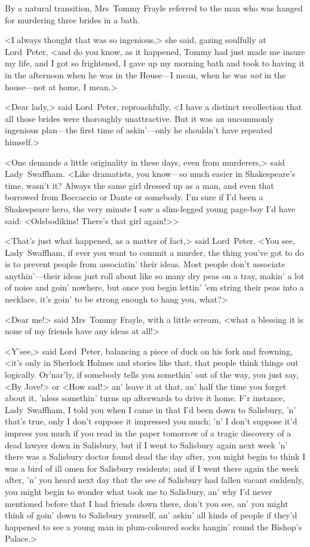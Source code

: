 By a natural transition, Mrs~Tommy Frayle referred to the man who was hanged for murdering three brides in a bath.

<I always thought that was so ingenious,> she said, gazing soulfully at Lord~Peter, <and do you know, as it happened, Tommy had just made me insure my life, and I got so frightened, I gave up my morning bath and took to having it in the afternoon when he was in the House—I mean, when he was \textit{not} in the house—not at home, I mean.>

<Dear lady,> said Lord~Peter, reproachfully, <I have a distinct recollection that all those brides were thoroughly unattractive. But it was an uncommonly ingenious plan—the first time of askin'—only he shouldn't have repeated himself.>

<One demands a little originality in these days, even from murderers,> said Lady~Swaffham. <Like dramatists, you know—so much easier in Shakespeare's time, wasn't it? Always the same girl dressed up as a man, and even that borrowed from Boccaccio or Dante or somebody. I'm sure if I'd been a Shakespeare hero, the very minute I saw a slim-legged young page-boy I'd have said: <Odsbodikins! There's that girl again!>>

<That's just what happened, as a matter of fact,> said Lord~Peter. <You see, Lady~Swaffham, if ever you want to commit a murder, the thing you've got to do is to prevent people from associatin' their ideas. Most people don't associate anythin'—their ideas just roll about like so many dry peas on a tray, makin' a lot of noise and goin' nowhere, but once you begin lettin' 'em string their peas into a necklace, it's goin' to be strong enough to hang you, what?>

<Dear me!> said Mrs~Tommy Frayle, with a little scream, <what a blessing it is none of my friends have any ideas at all!>

<Y'see,> said Lord~Peter, balancing a piece of duck on his fork and frowning, <it's only in Sherlock Holmes and stories like that, that people think things out logically. Or'nar'ly, if somebody tells you somethin' out of the way, you just say, <By Jove!> or <How sad!> an' leave it at that, an' half the time you forget about it, 'nless somethin' turns up afterwards to drive it home. F'r instance, Lady~Swaffham, I told you when I came in that I'd been down to Salisbury, 'n' that's true, only I don't suppose it impressed you much; 'n' I don't suppose it'd impress you much if you read in the paper tomorrow of a tragic discovery of a dead lawyer down in Salisbury, but if I went to Salisbury again next week 'n' there was a Salisbury doctor found dead the day after, you might begin to think I was a bird of ill omen for Salisbury residents; and if I went there again the week after, 'n' you heard next day that the see of Salisbury had fallen vacant suddenly, you might begin to wonder what took me to Salisbury, an' why I'd never mentioned before that I had friends down there, don't you see, an' you might think of goin' down to Salisbury yourself, an' askin' all kinds of people if they'd happened to see a young man in plum-coloured socks hangin' round the Bishop's Palace.>

